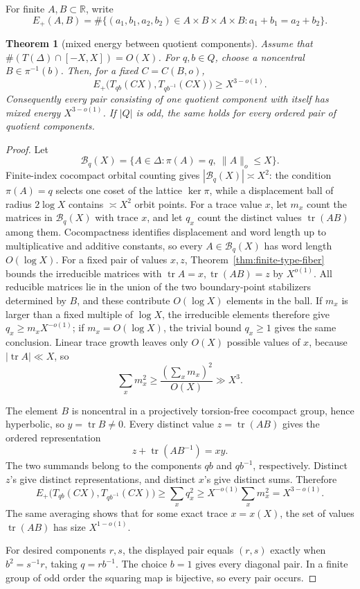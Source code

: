 \documentclass[11pt,reqno]{amsart}
\newtheorem{theorem}{Theorem}[section]
\theoremstyle{definition}
\theoremstyle{remark}
\newcommand{\R}{\mathbb R}
\newcommand{\Tr}{\operatorname{tr}}
\begin{document}
For finite \(A,B\subset\R\), write
\[
 E_+(A,B)=\#\{(a_1,b_1,a_2,b_2)\in A\times B\times A\times B:
                    a_1+b_1=a_2+b_2\}.
\]

\begin{theorem}[mixed energy between quotient components]
\label{thm:colored-mixed-energy}
Assume that \(\#(T(\Delta)\cap[-X,X])=O(X)\).  For \(q,b\in Q\), choose
a noncentral \(B\in\pi^{-1}(b)\).  Then, for a fixed \(C=C(B,o)\),
\[
 E_+\bigl(T_{qb}(CX),T_{qb^{-1}}(CX)\bigr)\ge X^{3-o(1)}.
\]
Consequently every pair consisting of one quotient component with itself has
mixed energy \(X^{3-o(1)}\).  If \(|Q|\) is odd, the same holds for every
ordered pair of quotient components.
\end{theorem}

\begin{proof}
Let
\[
 \mathcal B_q(X)=\{A\in\Delta:\pi(A)=q,\ \|A\|_o\le X\}.
\]
Finite-index cocompact orbital counting gives
\(|\mathcal B_q(X)|\asymp X^2\): the condition \(\pi(A)=q\) selects one
coset of the lattice \(\ker\pi\), while a displacement ball of radius
\(2\log X\) contains \(\asymp X^2\) orbit points.  For a trace value \(x\),
let \(m_x\)
count the matrices in \(\mathcal B_q(X)\) with trace \(x\), and let \(q_x\)
count the distinct values \(\Tr(AB)\) among them.  Cocompactness identifies
displacement and word length up to multiplicative and additive constants, so
every \(A\in\mathcal B_q(X)\) has word length \(O(\log X)\).  For a fixed
pair of values \(x,z\), Theorem~\ref{thm:finite-type-fiber} bounds the
irreducible matrices with
\(\Tr A=x,\Tr(AB)=z\) by \(X^{o(1)}\).  All reducible matrices lie in the
union of the two boundary-point stabilizers determined by \(B\), and these
contribute \(O(\log X)\) elements in the ball.  If
\(m_x\) is larger than a fixed multiple of \(\log X\), the irreducible
elements therefore give
\(q_x\ge m_xX^{-o(1)}\); if \(m_x=O(\log X)\), the trivial bound
\(q_x\ge1\) gives the same conclusion.  Linear trace growth leaves only
\(O(X)\) possible values of \(x\), because \(|\Tr A|\ll X\), so
\[
 \sum_xm_x^2\ge
 \frac{(\sum_xm_x)^2}{O(X)}\gg X^3.
\]

The element \(B\) is noncentral in a projectively torsion-free cocompact
group, hence hyperbolic, so \(y=\Tr B\ne0\).  Every distinct
value \(z=\Tr(AB)\) gives the ordered representation
\[
 z+\Tr(AB^{-1})=xy.
\]
The two summands belong to the components \(qb\) and \(qb^{-1}\),
respectively.
Distinct \(z\)'s give distinct representations, and distinct \(x\)'s give
distinct sums.  Therefore
\[
 E_+\bigl(T_{qb}(CX),T_{qb^{-1}}(CX)\bigr)
 \ge\sum_xq_x^2\ge X^{-o(1)}\sum_xm_x^2=X^{3-o(1)}.
\]
The same averaging shows that for some exact trace \(x=x(X)\), the set of
values \(\Tr(AB)\) has size \(X^{1-o(1)}\).

For desired components \(r,s\), the displayed pair equals \((r,s)\) exactly
when \(b^2=s^{-1}r\), taking \(q=rb^{-1}\).  The choice \(b=1\) gives
every diagonal pair.  In a finite group of odd order the squaring map is
bijective, so every pair occurs.
\end{proof}
\end{document}
